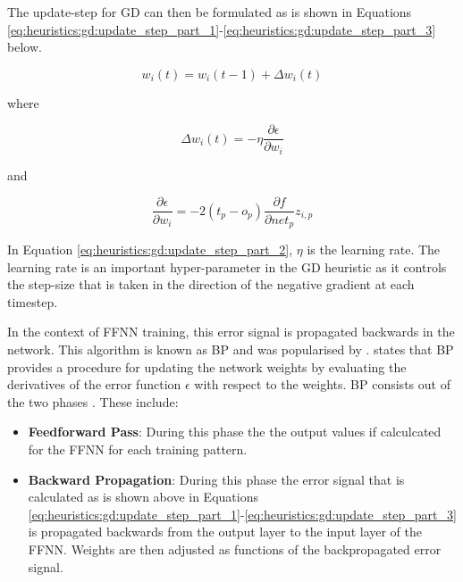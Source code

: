 The update-step for \ac{GD} can then be formulated as is shown in Equations \ref{eq:heuristics:gd:update_step_part_1}-\ref{eq:heuristics:gd:update_step_part_3} below.

\begin{equation}
    \label{eq:heuristics:gd:update_step_part_1}
    w_{i}(t) = w_{i}(t-1) + \Delta w_{i}(t)
\end{equation}

where

\begin{equation}
    \label{eq:heuristics:gd:update_step_part_2}
    \Delta w_{i}(t) = -\eta\frac{\partial \epsilon}{\partial w_{i}}
\end{equation}

and

\begin{equation}
    \label{eq:heuristics:gd:update_step_part_3}
    \frac{\partial \epsilon}{\partial w_{i}} = -2(t_{p} - o_{p})\frac{\partial f}{\partial net_{p}}z_{i,p}
\end{equation}

In Equation \ref{eq:heuristics:gd:update_step_part_2}, $\eta$ is the learning rate. The learning rate is an important hyper-parameter in the \ac{GD} heuristic as it controls the step-size that is taken in the direction of the negative gradient at each timestep.

In the context of \ac{FFNN} training, this error signal is propagated backwards in the network. This algorithm is known as \ac{BP} and was popularised by \citeauthor{ref:werbos:1994} \cite{ref:werbos:1994}. \citeauthor{ref:nel:2021} \cite{ref:nel:2021} states that \ac{BP} provides a procedure for updating the network weights by evaluating the derivatives of the error function $\epsilon$ with respect to the weights. \Ac{BP} consists out of the two phases \cite{ref:engelbrecht:2007}. These include:

\begin{itemize}
    \item \textbf{Feedforward Pass}: During this phase the the output values if calculcated for the \ac{FFNN} for each training pattern.
    \item \textbf{Backward Propagation}: During this phase the error signal that is calculated as is shown above in Equations \ref{eq:heuristics:gd:update_step_part_1}-\ref{eq:heuristics:gd:update_step_part_3} is propagated backwards from the output layer to the input layer of the \ac{FFNN}. Weights are then adjusted as functions of the backpropagated error signal.
\end{itemize}

